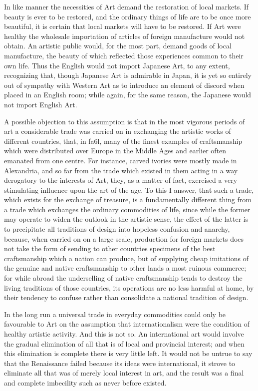 \documentclass{book}
\begin{document}
In like manner the necessities of Art demand the restoration of local markets. If beauty is ever to be restored, and the ordinary things of life are to be once more beautiful, it is certain that local markets will have to be restored. If Art were healthy the wholesale importation of articles of foreign manufacture would not obtain. An artistic public would, for the most part, demand goods of local manufacture, the beauty of which reflected those experiences common to their own life. Thus the English would not import Japanese Art, to any extent, recognizing that, though Japanese Art is admirable in Japan, it is yet so entirely out of sympathy with Western Art as to introduce an element of discord when placed in an English room; while again, for the same reason, the Japanese would not import English Art.

A possible objection to this assumption is that in the most vigorous periods of art a considerable trade was carried on in exchanging the artistic works of different countries, that, in fa6l, many of the finest examples of craftsmanship which were distributed over Europe in the Middle Ages and earlier often emanated from one centre. For instance, carved ivories were mostly made in Alexandria, and so far from the trade which existed in them acting in a way derogatory to the interests of Art, they, as a matter of fact, exercised a very stimulating influence upon the art of the age. To this I answer, that such a trade, which exists for the exchange of treasure, is a fundamentally different thing from a trade which exchanges the ordinary commodities of life, since while the former may operate to widen the outlook in the artistic sense, the effect of the latter is to precipitate all traditions of design into hopeless confusion and anarchy, because, when carried on on a large scale, production for foreign markets does not take the form of sending to other countries specimens of the best craftsmanship which a nation can produce, but of supplying cheap imitations of the genuine and native craftsmanship to other lands a most ruinous commerce; for while abroad the underselling of native craftsmanship tends to destroy the living traditions of those countries, its operations are no less harmful at home, by their tendency to confuse rather than consolidate a national tradition of design.

In the long run a universal trade in everyday commodities could only be favourable to Art on the assumption that internationalism were the condition of healthy artistic activity. And this is not so. An international art would involve the gradual elimination of all that is of local and provincial interest; and when this elimination is complete there is very little left. It would not be untrue to say that the Renaissance failed because its ideas were international, it strove to eliminate all that was of merely local interest in art, and the result was a final and complete imbecility such as never before existed.\footnotemark[4]
\end{document}
